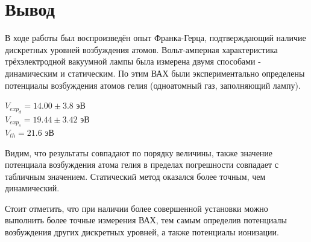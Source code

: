 \documentclass[a4paper]{article}
\begin{document}
\newpage

\section{Вывод}

В ходе работы был воспроизведён опыт Франка-Герца, подтверждающий наличие дискретных уровней возбуждения атомов. Вольт-амперная характеристика трёхэлектродной вакуумной лампы была измерена двумя способами - динамическим и статическим. По этим ВАХ были экспериментально определены потенциалы возбуждения атомов гелия (одноатомный газ, заполняющий лампу). 
\begin{center}
    $V_{exp}_d = 14.00 \pm 3.8$  эВ \\
    $V_{exp}_s = 19.44 \pm 3.42$ эВ \\
    $V_{th} = 21.6 $ эВ
\end{center}
Видим, что результаты совпадают по порядку величины, также значение потенциала возбуждения атома гелия в пределах погрешности совпадает с табличным значением. Статический метод оказался более точным, чем динамический. \par
Стоит отметить, что при наличии более совершенной установки можно выполнить более точные измерения ВАХ, тем самым определив потенциалы возбуждения других дискретных уровней, а также потенциалы ионизации.
\end{document}
